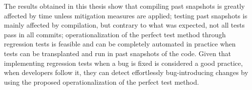 The results obtained in this thesis show that compiling past snapshots is greatly affected by time unless mitigation measures are applied; 
testing past snapshots is mainly affected by compilation, but contrary to what was expected, not all tests pass in all commits;
operationalization of the perfect test method through regression tests is feasible and can be completely automated in practice when tests can be transplanted and run in past snapshots of the code.
Given that implementing regression tests when a bug is fixed is considered a good practice, when developers follow it, they can detect effortlessly bug-introducing changes by using the proposed operationalization of the perfect test method.



